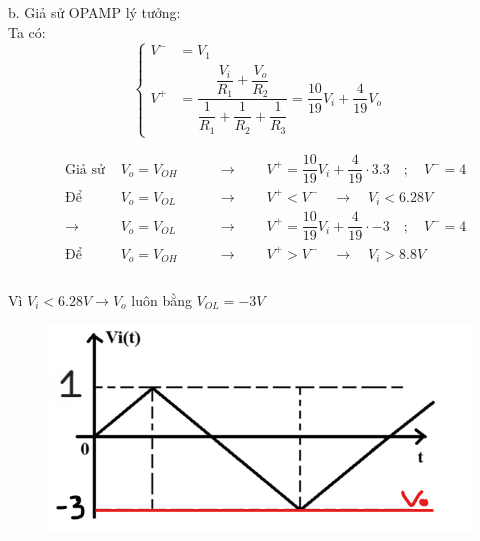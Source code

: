 b. Giả sử OPAMP lý tưởng:\\
Ta có:
\[
\left\{
\begin{aligned}
V^- &= V_1 \\
V^+ &= \dfrac{\dfrac{V_i}{R_1} + \dfrac{V_o}{R_2}}{\dfrac{1}{R_1} + \dfrac{1}{R_2} + \dfrac{1}{R_3}} = \dfrac{10}{19}V_i +\dfrac{4}{19}V_o
\end{aligned}
\right.
\]

\[
\begin{aligned}
&\text{Giả sử }& V_o = V_{OH} &\qquad\rightarrow\qquad V^+ = \dfrac{10}{19}V_i + \dfrac{4}{19}\cdot3.3 \quad;\quad V^- = 4 \\
&\text{Để }& V_o = V_{OL} &\qquad\rightarrow\qquad V^+ < V^- \quad\rightarrow\quad \boxed{V_i<6.28V}\\
&\rightarrow& V_o = V_{OL} &\qquad\rightarrow\qquad V^+ = \dfrac{10}{19}V_i + \dfrac{4}{19}\cdot-3 \quad;\quad V^- = 4 \\
&\text{Để }& V_o = V_{OH} &\qquad\rightarrow\qquad V^+ > V^- \quad\rightarrow\quad \boxed{V_i>8.8V}\\
\end{aligned}
\]\\
Vì $V_i<6.28V \rightarrow V_o$ luôn bằng $V_{OL}=-3V$ 
\begin{figure}[H]
	\centering
	\includegraphics[scale=0.6]{image/C12_b_BT.png}
\end{figure}

